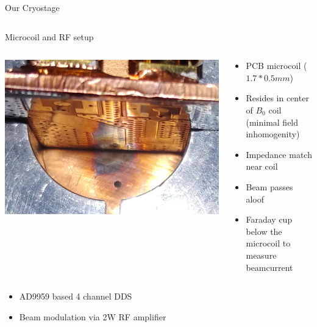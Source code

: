 \documentclass[final]{beamer}
\begin{document}
\begin{frame}[fragile]{}
\begin{columns}[T]
\begin{column}{.49\linewidth}
\begin{block}{\Large Our Cryostage}
\begin{columns}
\begin{column}{0.45\columnwidth}
			\end{column}
		\end{columns}
	\end{block}

	\begin{block}{\Large Microcoil and RF setup}
		\begin{columns}
			\begin{column}{0.45\columnwidth}
				\includegraphics[width=\columnwidth]{./figures/microcoil3.png}
			\end{column}
			\begin{column}{0.45\columnwidth}
				\begin{itemize}
					\item PCB microcoil ($1.7 * 0.5 mm$)
					\item Resides in center of $B_0$ coil (minimal field inhomogenity)
					\item Impedance match near coil
					\item Beam passes aloof
					\item Faraday cup below the microcoil to measure beamcurrent
				\end{itemize}
			\end{column}
		\end{columns}
		\vspace{1cm}
		\begin{columns}
			\begin{column}{0.45\columnwidth}
				\begin{itemize}
					\item AD9959 based 4 channel DDS
					\item Beam modulation via 2W RF amplifier

\end{itemize}
\end{column}
\end{columns}
\end{block}
\end{column}
\end{columns}
\end{frame}
\end{document}
